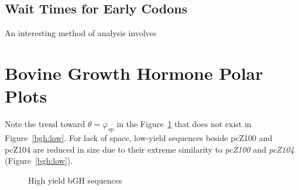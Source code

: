 \documentclass[10pt,twocolumn]{article}
\begin{document}
\subsection{Wait Times for Early Codons}

An interesting method of analysis involves 



\onecolumn
\appendix
\section{Bovine Growth Hormone Polar Plots}

Note the trend toward $\theta = \varphi_{sp}$ in the Figure~\ref{bgh:high} that does
not exist in Figure~\ref{bgh:low}. For lack of space, low-yield sequences beside pcZ100 and pcZ104
are reduced in size due to their extreme similarity to \emph{pcZ100} and \emph{pcZ104} (Figure~\ref{bgh:low}).

\begin{figure}[htp]
    \centering
    \caption{High yield bGH sequences}
    \label{bgh:high}
\end{figure}
\end{document}
